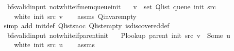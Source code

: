 \begin{isabellebody}
%
\isadelimproof
\isanewline
%
\endisadelimproof
\isanewline
{}\isamarkupfalse%
\ {\isacharparenleft}{\kern0pt}\ bfs{\isacharunderscore}{\kern0pt}valid{\isacharunderscore}{\kern0pt}input{\isacharparenright}{\kern0pt}\ not{\isacharunderscore}{\kern0pt}white{\isacharunderscore}{\kern0pt}if{\isacharunderscore}{\kern0pt}mem{\isacharunderscore}{\kern0pt}queue{\isacharunderscore}{\kern0pt}init{\isacharcolon}{\kern0pt}\isanewline
\ \ \ {\isachardoublequoteopen}v\ {\isasymin}\ set\ {\isacharparenleft}{\kern0pt}Q{\isacharunderscore}{\kern0pt}list\ {\isacharparenleft}{\kern0pt}queue\ {\isacharparenleft}{\kern0pt}init\ src{\isacharparenright}{\kern0pt}{\isacharparenright}{\kern0pt}{\isacharparenright}{\kern0pt}{\isachardoublequoteclose}\isanewline
\ \ \ {\isachardoublequoteopen}{\isasymnot}\ white\ {\isacharparenleft}{\kern0pt}init\ src{\isacharparenright}{\kern0pt}\ v{\isachardoublequoteclose}\isanewline
%
\isadelimproof
\ \ %
\endisadelimproof
%
\isatagproof
{}\isamarkupfalse%
\ assms\ Q{\isachardot}{\kern0pt}invar{\isacharunderscore}{\kern0pt}empty\isanewline
\ \ \isamarkupfalse%
\ {\isacharparenleft}{\kern0pt}simp\ add{\isacharcolon}{\kern0pt}\ init{\isacharunderscore}{\kern0pt}def\ Q{\isachardot}{\kern0pt}list{\isacharunderscore}{\kern0pt}snoc\ Q{\isachardot}{\kern0pt}list{\isacharunderscore}{\kern0pt}empty\ is{\isacharunderscore}{\kern0pt}discovered{\isacharunderscore}{\kern0pt}def{\isacharparenright}{\kern0pt}%
\endisatagproof
{\isafoldproof}%
%
\isadelimproof
\isanewline
%
\endisadelimproof
\isanewline
{}\isamarkupfalse%
\ {\isacharparenleft}{\kern0pt}\ bfs{\isacharunderscore}{\kern0pt}valid{\isacharunderscore}{\kern0pt}input{\isacharparenright}{\kern0pt}\ not{\isacharunderscore}{\kern0pt}white{\isacharunderscore}{\kern0pt}if{\isacharunderscore}{\kern0pt}parent{\isacharunderscore}{\kern0pt}init{\isacharcolon}{\kern0pt}\isanewline
\ \ \ {\isachardoublequoteopen}P{\isacharunderscore}{\kern0pt}lookup\ {\isacharparenleft}{\kern0pt}parent\ {\isacharparenleft}{\kern0pt}init\ src{\isacharparenright}{\kern0pt}{\isacharparenright}{\kern0pt}\ v\ {\isacharequal}{\kern0pt}\ Some\ u{\isachardoublequoteclose}\isanewline
\ \ \ {\isachardoublequoteopen}{\isasymnot}\ white\ {\isacharparenleft}{\kern0pt}init\ src{\isacharparenright}{\kern0pt}\ u{\isachardoublequoteclose}\isanewline
%
\isadelimproof
\ \ %
\endisadelimproof
%
\isatagproof
{}\isamarkupfalse%
\ assms\isanewline
\ \ \isamarkupfalse%

\end{isabellebody}
